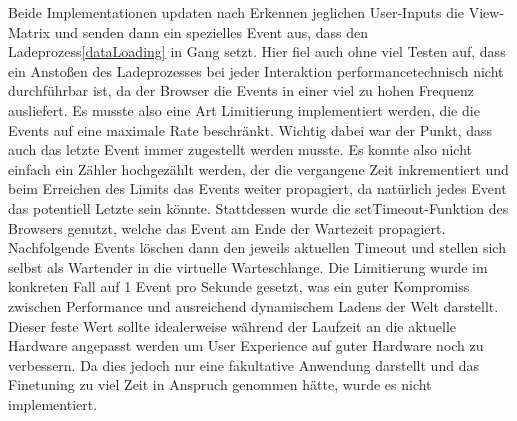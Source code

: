 Beide Implementationen updaten nach Erkennen jeglichen User-Inputs die View-Matrix und senden dann ein spezielles Event aus, dass den Ladeprozess\ref{dataLoading} in Gang setzt. Hier fiel auch ohne viel Testen auf, dass ein Anstoßen des Ladeprozesses bei jeder Interaktion performancetechnisch nicht durchführbar ist, da der Browser die Events in einer viel zu hohen Frequenz ausliefert. Es musste also eine Art Limitierung implementiert werden, die die Events auf eine maximale Rate beschränkt. Wichtig dabei war der Punkt, dass auch das letzte Event immer zugestellt werden musste. Es konnte also nicht einfach ein Zähler hochgezählt werden, der die vergangene Zeit inkrementiert und beim Erreichen des Limits das Events weiter propagiert, da natürlich jedes Event das potentiell Letzte sein könnte. Stattdessen wurde die setTimeout-Funktion des Browsers genutzt, welche das Event am Ende der Wartezeit propagiert. Nachfolgende Events löschen dann den jeweils aktuellen Timeout und stellen sich selbst als Wartender in die virtuelle Warteschlange. Die Limitierung wurde im konkreten Fall auf 1 Event pro Sekunde gesetzt, was ein guter Kompromiss zwischen Performance und ausreichend dynamischem Ladens der Welt darstellt. Dieser feste Wert sollte idealerweise während der Laufzeit an die aktuelle Hardware angepasst werden um User Experience auf guter Hardware noch zu verbessern. Da dies jedoch nur eine fakultative Anwendung darstellt und das Finetuning zu viel Zeit in Anspruch genommen hätte, wurde es nicht implementiert.


